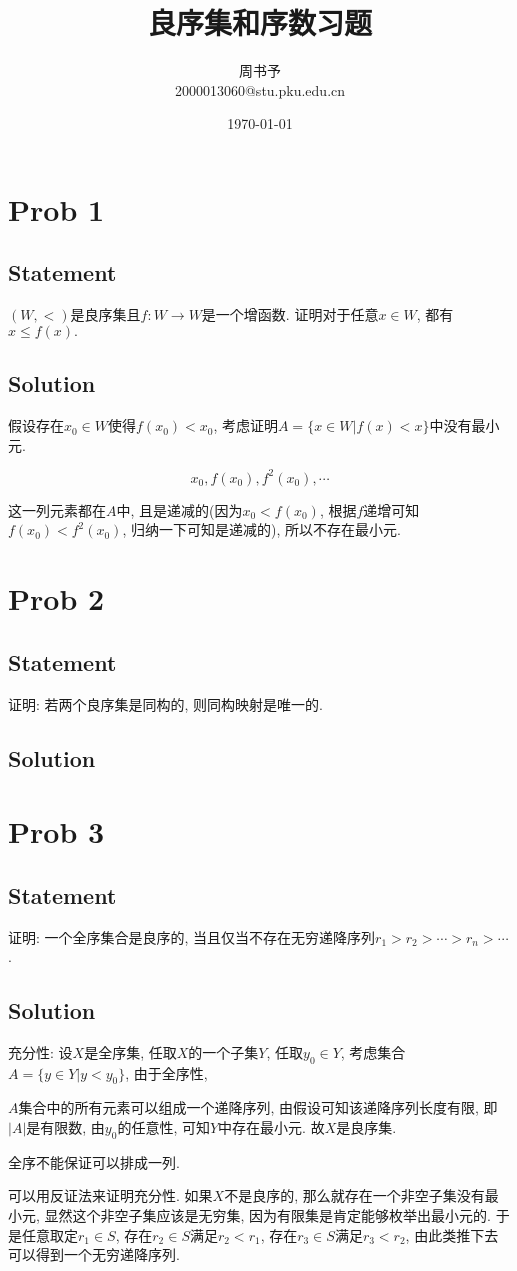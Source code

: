 \documentclass[UTF-8]{ctexart}
\title{\heiti\zihao{1}   良序集和序数习题}
\author{\kaishu\zihao{-3} 周书予\\2000013060@stu.pku.edu.cn}
\date{\today}
\begin{document}
\maketitle
{\color{blue}
\section{Prob 1}
\subsection{Statement}
$(W, <)$是良序集且$f: W \to W$是一个增函数. 证明对于任意$x \in W$, 都有$x \le f(x).$
\subsection{Solution}
假设存在$x_0 \in W$使得$f(x_0) < x_0$, 考虑证明$A = \{x \in W | f(x) < x\}$中没有最小元.

$$x_0, f(x_0), f^2(x_0), \cdots$$

这一列元素都在$A$中, 且是递减的(因为$x_0 < f(x_0)$, 根据$f$递增可知$f(x_0) < f^2(x_0)$, 归纳一下可知是递减的), 所以不存在最小元.

\section{Prob 2}
\subsection{Statement}
证明: 若两个良序集是同构的, 则同构映射是唯一的.
\subsection{Solution}

}
\section{Prob 3}
\subsection{Statement}
证明: 一个全序集合是良序的, 当且仅当不存在无穷递降序列$r_1 > r_2 > \cdots > r_n > \cdots$.
\subsection{Solution}

充分性: 设$X$是全序集, 任取$X$的一个子集$Y$, 任取$y_0 \in Y$, 考虑集合$A = \{y \in Y | y < y_0\}$, 由于全序性,{\color{red} $A$集合中的所有元素可以组成一个递降序列, 由假设可知该递降序列长度有限, 即$|A|$是有限数, 由$y_0$的任意性, 可知$Y$中存在最小元. 故$X$是良序集.

全序不能保证可以排成一列. 

可以用反证法来证明充分性. 如果$X$不是良序的, 那么就存在一个非空子集没有最小元, 显然这个非空子集应该是无穷集, 因为有限集是肯定能够枚举出最小元的. 于是任意取定$r_1 \in S$, 存在$r_2 \in S$满足$r_2 < r_1$, 存在$r_3 \in S$满足$r_3 < r_2$, 由此类推下去可以得到一个无穷递降序列.
}
\end{document}
